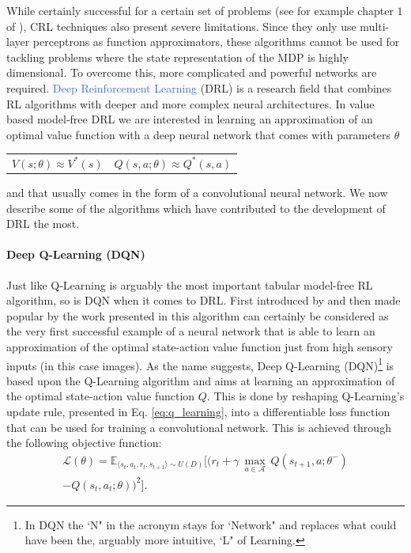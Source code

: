 While certainly successful for a certain set of problems (see for example chapter $1$ of \cite{sabatelli2017learning}), CRL techniques also present severe limitations. Since they only use multi-layer perceptrons as function approximators, these algorithms cannot be used for tackling problems where the state representation of the MDP is highly dimensional. To overcome this, more complicated and powerful networks are required. \textcolor{RoyalBlue}{Deep Reinforcement Learning} (DRL) \cite{arulkumaran2017deep, li2017deep, franccois2018introduction} is a research field that combines RL algorithms with deeper and more complex neural architectures. In value based model-free DRL we are interested in learning an approximation of an optimal value function with a deep neural network that comes with parameters $\theta$

\noindent
\begin{tabularx}{\linewidth}{@{}XX@{}}
\begin{equation}
	  V(s;\theta)\approx V^{*}(s)
	  \label{eq:v_approx}
  \end{equation}
&
\begin{equation}  
	Q(s,a;\theta)\approx Q^{*}(s,a)
	\label{eq:q_approx}
  \end{equation}
\end{tabularx}
and that usually comes in the form of a convolutional neural network. We now describe some of the algorithms which have contributed to the development of DRL the most. 


\paragraph{\textbf{\uppercase{D}eep \uppercase{Q}-\uppercase{L}earning (\uppercase{DQN})}} Just like Q-Learning is arguably the most important tabular model-free RL algorithm, so is DQN when it comes to DRL. First introduced by \citet{mnih2013playing} and then made popular by the work presented in \cite{mnih2015human} this algorithm can certainly be considered as the very first successful example of a neural network that is able to learn an approximation of the optimal state-action value function just from high sensory inputs (in this case images). As the name suggests, Deep Q-Learning (DQN)\footnote{In DQN the `N" in the acronym stays for `Network" and replaces what could have been the, arguably more intuitive, `L" of Learning.} is based upon the Q-Learning algorithm and aims at learning an approximation of the optimal state-action value function $Q$. This is done by reshaping Q-Learning's update rule, presented in Eq. \ref{eq:q_learning}, into a differentiable loss function that can be used for training a convolutional network. This is achieved through the following objective function:
\begin{multline}
	\mathcal{L}(\theta) = \mathds{E}_{\langle s_{t},a_{t},r_{t},s_{t+1}\rangle\sim U(D)} \bigg[\big(r_{t} + \gamma \: \underset{a\in \mathcal{A}}{\max}\: Q(s_{t+1}, a; \theta^{-}) \\ - Q(s_{t}, a_{t}; \theta)\big)^{2}\bigg].
\label{eq:dqn}
\end{multline}

